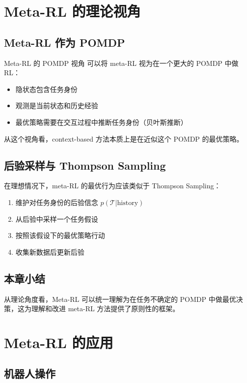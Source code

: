 \documentclass[a4paper]{article}
\begin{document}
\section{Meta-RL 的理论视角}

\subsection{Meta-RL 作为 POMDP}

\begin{importantbox}{Meta-RL 的 POMDP 视角}
可以将 meta-RL 视为在一个更大的 POMDP 中做 RL：
\begin{itemize}
    \item 隐状态包含任务身份
    \item 观测是当前状态和历史经验
    \item 最优策略需要在交互过程中推断任务身份（贝叶斯推断）
\end{itemize}
从这个视角看，context-based 方法本质上是在近似这个 POMDP 的最优策略。
\end{importantbox}

\subsection{后验采样与 Thompson Sampling}

在理想情况下，meta-RL 的最优行为应该类似于 Thompson Sampling：
\begin{enumerate}
    \item 维护对任务身份的后验信念 $p(\mathcal{T} | \text{history})$
    \item 从后验中采样一个任务假设
    \item 按照该假设下的最优策略行动
    \item 收集新数据后更新后验
\end{enumerate}

\subsection{本章小结}

从理论角度看，Meta-RL 可以统一理解为在任务不确定的 POMDP 中做最优决策，这为理解和改进 meta-RL 方法提供了原则性的框架。

\section{Meta-RL 的应用}

\subsection{机器人操作}
\end{document}
